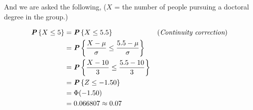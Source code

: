 And we are asked the following, ($X$ = the number of people pursuing a doctoral degree in the group.)

\begin{align*}
  \textbf{\textit{P}}\left\{X \leq 5\right\} &= \textbf{\textit{P}}\left\{X \leq 5.5\right\} &(\textit{Continuity correction})\\  
  &= \textbf{\textit{P}}\left\{\dfrac{X - \mu}{\sigma} \leq \dfrac{5.5 - \mu}{\sigma}\right\}\\
  &= \textbf{\textit{P}}\left\{\dfrac{X - 10}{3} \leq \dfrac{5.5 - 10}{3}\right\}\\
  &= \textbf{\textit{P}}\left\{Z \leq - 1.50\right\}\\
  &= \Phi(- 1.50)\\
  &= 0.066807 \approx 0.07
\end{align*}



